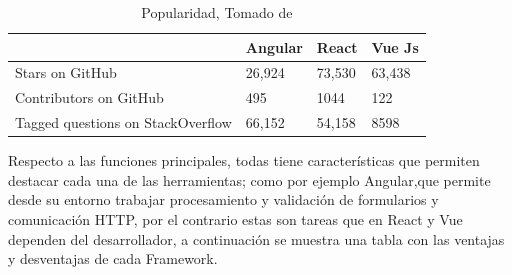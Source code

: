 \documentclass[a4paper,12 pt]{article}
\begin{document}
\begin{table}[H]
    \centering
    \small{
    \begin{tabular}{|M{5cm}|M{2.5cm}|M{2.5cm}|M{2.5cm}|}
        \hline
         &\textbf{Angular}   &\textbf{React} &\textbf{Vue Js}\\
        \hline 
            Stars on GitHub   & 26,924
        & 73,530 & 63,438
            \\
        \hline
            Contributors on GitHub & 495
        & 1044 & 122
            \\
        \hline
            Tagged questions on StackOverflow  & 66,152
        & 54,158 & 8598
            \\
        \hline
    \end{tabular}
    \caption{Popularidad, Tomado de \cite{03}}
    \label{Riesgo}}
\end{table}{}

Respecto a las funciones principales, todas tiene características que permiten destacar cada una de las herramientas; como por ejemplo Angular,que permite desde su entorno trabajar procesamiento y validación de formularios y comunicación HTTP, por el contrario estas son tareas que en React y Vue dependen del desarrollador, a continuación se muestra una tabla con las ventajas y desventajas de cada Framework.
\end{document}
